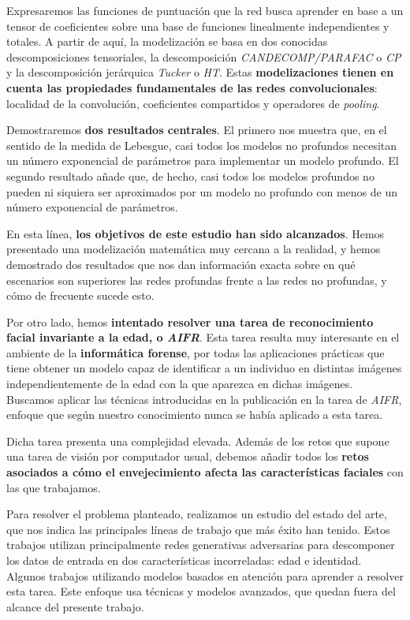 Expresaremos las funciones de puntuación que la red busca aprender en base a un tensor de coeficientes sobre una base de funciones linealmente independientes y totales. A partir de aquí, la modelización se basa en dos conocidas descomposiciones tensoriales, la descomposición \textit{CANDECOMP/PARAFAC} o \textit{CP} y la descomposición jerárquica \textit{Tucker} o \textit{HT}. Estas \textbf{modelizaciones tienen en cuenta las propiedades fundamentales de las redes convolucionales}: localidad de la convolución, coeficientes compartidos y operadores de \textit{pooling}.

Demostraremos \textbf{dos resultados centrales}. El primero nos muestra que, en el sentido de la medida de Lebesgue, casi todos los modelos no profundos necesitan un número exponencial de parámetros para implementar un modelo profundo. El segundo resultado añade que, de hecho, casi todos los modelos profundos no pueden ni siquiera ser aproximados por un modelo no profundo con menos de un número exponencial de parámetros.

En esta línea, \textbf{los objetivos de este estudio han sido alcanzados}. Hemos presentado una modelización matemática muy cercana a la realidad, y hemos demostrado dos resultados que nos dan información exacta sobre en qué escenarios son superiores las redes profundas frente a las redes no profundas, y cómo de frecuente sucede esto.

Por otro lado, hemos \textbf{intentado resolver una tarea de reconocimiento facial invariante a la edad, o \textit{AIFR}}. Esta tarea resulta muy interesante en el ambiente de la \textbf{informática forense}, por todas las aplicaciones prácticas que tiene obtener un modelo capaz de identificar a un individuo en distintas imágenes independientemente de la edad con la que aparezca en dichas imágenes. Buscamos aplicar las técnicas introducidas en la publicación \cite{informatica:principal} en la tarea de \textit{AIFR}, enfoque que según nuestro conocimiento nunca se había aplicado a esta tarea.

Dicha tarea presenta una complejidad elevada. Además de los retos que supone una tarea de visión por computador usual, debemos añadir todos los \textbf{retos asociados a cómo el envejecimiento afecta las características faciales} con las que trabajamos.

Para resolver el problema planteado, realizamos un estudio del estado del arte, que nos indica las principales líneas de trabajo que más éxito han tenido. Estos trabajos utilizan principalmente redes generativas adversarias para descomponer los datos de entrada en dos características incorreladas: edad e identidad. Algunos trabajos utilizando modelos basados en atención para aprender a resolver esta tarea. Este enfoque usa técnicas y modelos avanzados, que quedan fuera del alcance del presente trabajo.

